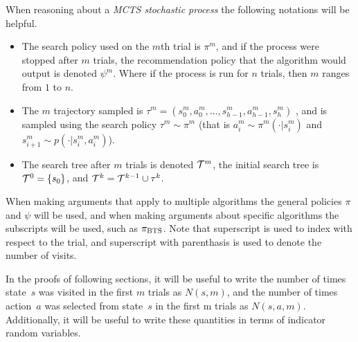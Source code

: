         When reasoning about a \textit{MCTS stochastic process} the following notations will be helpful.
        \begin{itemize}
            \item 
                The search policy used on the $m$th trial is $\pi^m$, and if the process were stopped after $m$ trials, the recommendation policy that the algorithm would output is denoted $\psi^m$. Where if the process is run for $n$ trials, then $m$ ranges from $1$ to $n$.
            \item 
                The $m$ trajectory sampled is $\tau^m=(s_0^m,a_0^m,...,s_{h-1}^m,a_{h-1}^m,s_{h}^m)$ , and is sampled using the search policy $\tau^m \sim \pi^m$ (that is $a^m_i \sim \pi^m(\cdot|s^m_i)$ and $s^m_{i+1} \sim p(\cdot | s^m_i, a^m_i)$). 
            \item 
                The search tree after $m$ trials is denoted $\mathcal{T}^m$, the initial search tree is $\mathcal{T}^0=\{s_0\}$, and $\mathcal{T}^k = \mathcal{T}^{k-1} \cup \tau^k$.
        \end{itemize}

        When making arguments that apply to multiple algorithms the general policies $\pi$ and $\psi$ will be used, and when making arguments about specific algorithms the subscripts will be used, such as ${\pi_{{\textnormal{BTS}}}}$. Note that superscript is used to index with respect to the trial, and superscript with parenthasis is used to denote the number of visits.

        In the proofs of following sections, it will be useful to write the number of times state~$s$ was visited in the first $m$ trials as $N(s,m)$, and the number of times action~$a$ was selected from state~$s$ in the first m trials as $N(s,a,m).$ Additionally, it will be useful to write these quantities in terms of indicator random variables. 

